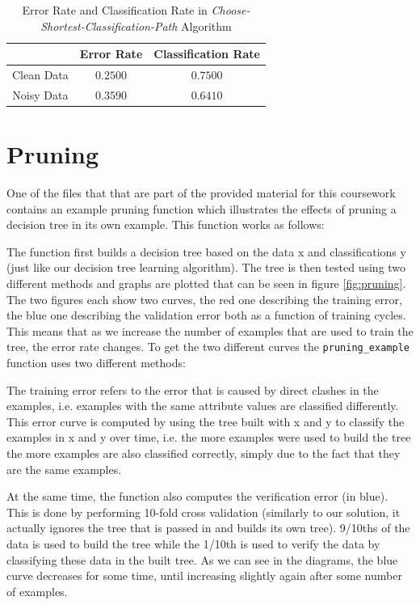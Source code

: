 \documentclass[10pt,a4paper]{article}
\begin{document}
\begin{table}[!ht]
\centering
\begin{tabular}{|c|c|c|}
\hline 
 & \textbf{Error Rate} & \textbf{Classification Rate} \\ 
\hline 
Clean Data & $0.2500$ & $0.7500$ \\ 
\hline 
Noisy Data & $0.3590$ & $0.6410$ \\ 
\hline 
\end{tabular} 
\caption{Error Rate and Classification Rate in \emph{Choose-Shortest-Classification-Path} Algorithm}
\label{tab:chooseDepthRates}
\end{table}

\section{Pruning}

One of the files that that are part of the provided material for this coursework contains an example pruning function which illustrates the effects of pruning a decision tree in its own example. This function works as follows:

The function first builds a decision tree based on the data x and classifications y (just like our decision tree learning algorithm). The tree is then tested using two different methods and graphs are plotted that can be seen in figure \ref{fig:pruning}. The two figures each show two curves, the red one describing the training error, the blue one describing the validation error both as a function of training cycles. This means that as we increase the number of examples that are used to train the tree, the error rate changes.
To get the two different curves the \texttt{pruning\_example} function uses two different methods:

The training error refers to the error that is caused by direct clashes in the examples, i.e. examples with the same attribute values are classified differently. This error curve is computed by using the tree built with x and y to classify the examples in x and y over time, i.e. the more examples were used to build the tree the more examples are also classified correctly, simply due to the fact that they are the same examples.

At the same time, the function also computes the verification error (in blue). This is done by performing 10-fold cross validation (similarly to our solution, it actually ignores the tree that is passed in and builds its own tree). 9/10ths of the data is used to build the tree while the 1/10th is used to verify the data by classifying these data in the built tree. As we can see in the diagrams, the blue curve decreases for some time, until increasing slightly again after some number of examples. 
\end{document}
